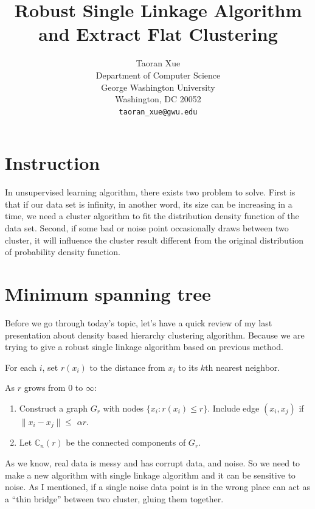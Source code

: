\documentclass{article}
\title{Robust Single Linkage Algorithm and Extract Flat Clustering}
\author{
  Taoran Xue \\
  Department of Computer Science\\
  George Washington University\\
  Washington, DC 20052 \\
  \texttt{taoran\_xue@gwu.edu} \\
}
\begin{document}
	
	\maketitle
	
	\section{Instruction}
	
	In unsupervised learning algorithm, there exists two problem to solve. First is that if our data set is infinity, in another word, its size can be increasing in a time, we need a cluster algorithm to fit the distribution density function of the data set. Second, if some bad or noise point occasionally draws between two cluster, it will influence the cluster result different from the original distribution of probability density function.
	
	\section{Minimum spanning tree}
	
	Before we go through today's topic, let's have a quick review of my last presentation about density based hierarchy clustering algorithm. Because we are trying to give a robust single linkage algorithm based on previous method.
	
	
	
		For each $i$, set $r(x_i)$ to the distance from $x_i$ to its $k$th nearest neighbor.
		
		As $r$ grows from $0$ to $\infty$:
		\begin{enumerate}
			\item Construct a graph $G_r$ with nodes $\{x_i : r(x_i) \leq r\}$. Include edge $(x_i, x_j)$ if $\|x_i - x_j\| \leq$ $\alpha r$.
			\item Let $\mathbb{C}_n(r)$ be the connected components of $G_r$.
		\end{enumerate}  
		
	
	As we know, real data is messy and has corrupt data, and noise. So we need to make a new algorithm with single linkage algorithm and it can be sensitive to noise. As I mentioned, if a single noise data point is in the wrong place can act as a ``thin bridge'' between two cluster, gluing them together.
	
\end{document}
